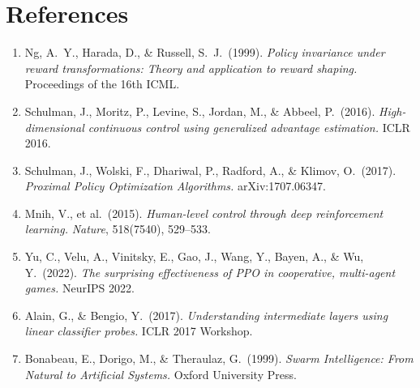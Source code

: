 \documentclass[11pt,a4paper]{article}
\begin{document}
\section*{References}

\begin{enumerate}
  \item Ng, A.~Y., Harada, D., \& Russell, S.~J.\ (1999).
        \textit{Policy invariance under reward transformations: Theory and application
        to reward shaping.}
        Proceedings of the 16th ICML.

  \item Schulman, J., Moritz, P., Levine, S., Jordan, M., \& Abbeel, P.\ (2016).
        \textit{High-dimensional continuous control using generalized advantage estimation.}
        ICLR 2016.

  \item Schulman, J., Wolski, F., Dhariwal, P., Radford, A., \& Klimov, O.\ (2017).
        \textit{Proximal Policy Optimization Algorithms.}
        arXiv:1707.06347.

  \item Mnih, V., et al.\ (2015).
        \textit{Human-level control through deep reinforcement learning.}
        \textit{Nature}, 518(7540), 529--533.

  \item Yu, C., Velu, A., Vinitsky, E., Gao, J., Wang, Y., Bayen, A., \& Wu, Y.\ (2022).
        \textit{The surprising effectiveness of PPO in cooperative, multi-agent games.}
        NeurIPS 2022.

  \item Alain, G., \& Bengio, Y.\ (2017).
        \textit{Understanding intermediate layers using linear classifier probes.}
        ICLR 2017 Workshop.

  \item Bonabeau, E., Dorigo, M., \& Theraulaz, G.\ (1999).
        \textit{Swarm Intelligence: From Natural to Artificial Systems.}
        Oxford University Press.
\end{enumerate}
\end{document}
